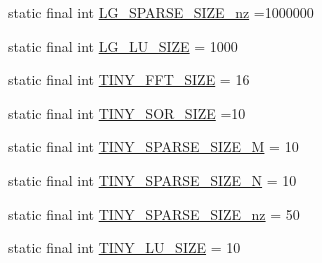 \begin{DoxyCompactItemize}
static final int \hyperlink{classjnt_1_1scimark2_1_1Constants_a8c8d6b23ebf9d50f5fbc2d455b627c6a}{L\-G\-\_\-\-S\-P\-A\-R\-S\-E\-\_\-\-S\-I\-Z\-E\-\_\-nz} =1000000
\item 
static final int \hyperlink{classjnt_1_1scimark2_1_1Constants_a81f5d4ec0dd43a48b2d0f1a20c1224a7}{L\-G\-\_\-\-L\-U\-\_\-\-S\-I\-Z\-E} = 1000
\item 
static final int \hyperlink{classjnt_1_1scimark2_1_1Constants_a350c008c087492cfec4349d5ffeaeee4}{T\-I\-N\-Y\-\_\-\-F\-F\-T\-\_\-\-S\-I\-Z\-E} = 16
\item 
static final int \hyperlink{classjnt_1_1scimark2_1_1Constants_ab810837d3ec760e9954f8bc70a0c3e61}{T\-I\-N\-Y\-\_\-\-S\-O\-R\-\_\-\-S\-I\-Z\-E} =10
\item 
static final int \hyperlink{classjnt_1_1scimark2_1_1Constants_a643aaa5129ce9b59fc922159c66db76d}{T\-I\-N\-Y\-\_\-\-S\-P\-A\-R\-S\-E\-\_\-\-S\-I\-Z\-E\-\_\-\-M} = 10
\item 
static final int \hyperlink{classjnt_1_1scimark2_1_1Constants_ac00b99ad896c985a8dca9dc7cd050e09}{T\-I\-N\-Y\-\_\-\-S\-P\-A\-R\-S\-E\-\_\-\-S\-I\-Z\-E\-\_\-\-N} = 10
\item 
static final int \hyperlink{classjnt_1_1scimark2_1_1Constants_a5ca96df045d274bb2bf6d05acaafa382}{T\-I\-N\-Y\-\_\-\-S\-P\-A\-R\-S\-E\-\_\-\-S\-I\-Z\-E\-\_\-nz} = 50
\item 
static final int \hyperlink{classjnt_1_1scimark2_1_1Constants_a7b618c1bc7d52e6bd15f8dd6c70e3fec}{T\-I\-N\-Y\-\_\-\-L\-U\-\_\-\-S\-I\-Z\-E} = 10
\end{DoxyCompactItemize}


